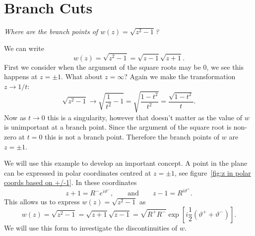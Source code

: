 \documentclass{article}
\begin{document}
    \section{Branch Cuts}\label{sec:branch cuts}
    \begin{example}
        \textit{Where are the branch points of \(w(z) = \sqrt{z^2 - 1}\)?}
        
        We can write
        \[w(z) = \sqrt{z^2 - 1} = \sqrt{z - 1}\sqrt{z + 1}.\]
        First we consider when the argument of the square roots may be \(0\), we see this happens at \(z = \pm 1\).
        What about \(z = \infty\)?
        Again we make the transformation \(z \to 1/t\):
        \[\sqrt{z^2 - 1} \to \sqrt{\frac{1}{t^2} - 1} = \sqrt{\frac{1 - t^2}{t^2}} = \frac{\sqrt{1 - t^2}}{t}.\]
        Now as \(t \to 0\) this is a singularity, however that doesn't matter as the value of \(w\) is unimportant at a branch point.
        Since the argument of the square root is non-zero at \(t = 0\) this is not a branch point.
        Therefore the branch points of \(w\) are \(z = \pm 1\).
    \end{example}
    We will use this example to develop an important concept.
    A point in the plane can be expressed in polar coordinates centred at \(z = \pm 1\), see figure~\ref{fig:z in polar coords based on +/-1}.
    In these coordinates
    \[z + 1 = R^- e^{i\vartheta^-}, \qquad\text{and}\qquad z - 1 = R^{i\vartheta^+}.\]
    This allows us to express \(w(z) = \sqrt{z^2 - 1}\) as
    \[w(z) = \sqrt{z^2 - 1} = \sqrt{z + 1}\sqrt{z - 1} = \sqrt{R^+R^-}\exp\left[i\frac{1}{2}(\vartheta^+ + \vartheta^-)\right].\]
    We will use this form to investigate the discontinuities of \(w\).
\end{document}

